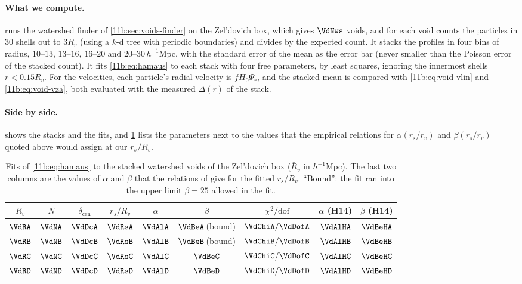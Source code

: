 \paragraph{What we compute.}
 runs the watershed finder of \cref{11b:sec:voids-finder} on
the Zel'dovich box, which gives $\VdNws$ voids, and for each void counts the
particles in $30$ shells out to $3R_v$ (using a $k$-d tree with periodic boundaries)
and divides by the expected count. It stacks the profiles in four bins of radius,
$10$--$13$, $13$--$16$, $16$--$20$ and $20$--$30\,h^{-1}$Mpc, with the standard
error of the mean as the error bar (never smaller than the Poisson error of the
stacked count). It fits \eqref{11b:eq:hamaus} to each stack with four free
parameters, by least squares, ignoring the innermost shells $r<0.15R_v$. For the
velocities, each particle's radial velocity is $fH_0\Psi_r$, and the stacked
mean is compared with \eqref{11b:eq:void-vlin} and \eqref{11b:eq:void-vza}, both
evaluated with the measured $\Delta(r)$ of the stack.

\paragraph{Side by side.}
 shows the stacks and the fits, and
\cref{11b:tab:hamaus} lists the parameters next to the values that the empirical relations for $\alpha(r_s/r_v)$ and
$\beta(r_s/r_v)$ quoted above would assign at our $r_s/R_v$.

\begin{table}[htbp]
\centering
\small
\begin{tabular}{ccccccccc}
\toprule
$\bar R_v$ & $N$ & $\delta_{\mathrm{cen}}$ & $r_s/R_v$ & $\alpha$ & $\beta$ &
$\chi^2/\text{dof}$ & $\alpha$ (H14) & $\beta$ (H14)\\
\midrule
$\VdRA$ & $\VdNA$ & $\VdDcA$ & $\VdRsA$ & $\VdAlA$ & $\VdBeA$\,(bound) & $\VdChiA/\VdDofA$ & $\VdAlHA$ & $\VdBeHA$\\
$\VdRB$ & $\VdNB$ & $\VdDcB$ & $\VdRsB$ & $\VdAlB$ & $\VdBeB$\,(bound) & $\VdChiB/\VdDofB$ & $\VdAlHB$ & $\VdBeHB$\\
$\VdRC$ & $\VdNC$ & $\VdDcC$ & $\VdRsC$ & $\VdAlC$ & $\VdBeC$ & $\VdChiC/\VdDofC$ & $\VdAlHC$ & $\VdBeHC$\\
$\VdRD$ & $\VdND$ & $\VdDcD$ & $\VdRsD$ & $\VdAlD$ & $\VdBeD$ & $\VdChiD/\VdDofD$ & $\VdAlHD$ & $\VdBeHD$\\
\bottomrule
\end{tabular}
\caption{Fits of \eqref{11b:eq:hamaus} to the stacked watershed voids of the
Zel'dovich box ($\bar R_v$ in $h^{-1}$Mpc). The last two columns are the values of
$\alpha$ and $\beta$ that the relations of 
give for the fitted $r_s/R_v$. ``Bound'': the fit ran into the upper limit
$\beta=25$ allowed in the fit.}
\label{11b:tab:hamaus}
\end{table}

